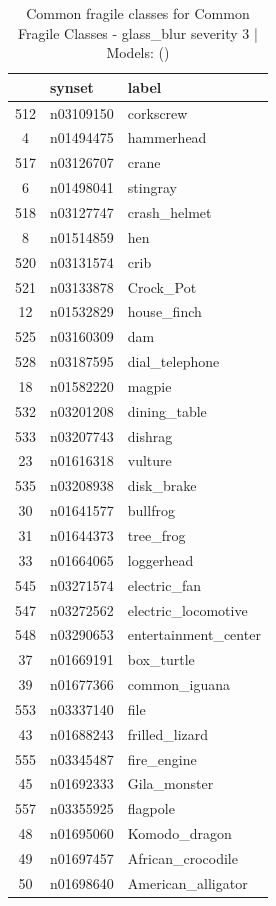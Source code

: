 \begin{table}
\caption{Common fragile classes for Common Fragile Classes - glass_blur severity 3 | Models: ()}
\label{tab:Common Fragile Classes - glass_blur severity 3_d41d8cd9}
\begin{tabular}{cll}
\toprule
 & synset & label \\
\midrule
512 & n03109150 & corkscrew \\
4 & n01494475 & hammerhead \\
517 & n03126707 & crane \\
6 & n01498041 & stingray \\
518 & n03127747 & crash_helmet \\
8 & n01514859 & hen \\
520 & n03131574 & crib \\
521 & n03133878 & Crock_Pot \\
12 & n01532829 & house_finch \\
525 & n03160309 & dam \\
528 & n03187595 & dial_telephone \\
18 & n01582220 & magpie \\
532 & n03201208 & dining_table \\
533 & n03207743 & dishrag \\
23 & n01616318 & vulture \\
535 & n03208938 & disk_brake \\
30 & n01641577 & bullfrog \\
31 & n01644373 & tree_frog \\
33 & n01664065 & loggerhead \\
545 & n03271574 & electric_fan \\
547 & n03272562 & electric_locomotive \\
548 & n03290653 & entertainment_center \\
37 & n01669191 & box_turtle \\
39 & n01677366 & common_iguana \\
553 & n03337140 & file \\
43 & n01688243 & frilled_lizard \\
555 & n03345487 & fire_engine \\
45 & n01692333 & Gila_monster \\
557 & n03355925 & flagpole \\
48 & n01695060 & Komodo_dragon \\
49 & n01697457 & African_crocodile \\
50 & n01698640 & American_alligator \\

\end{tabular}
\end{table}
